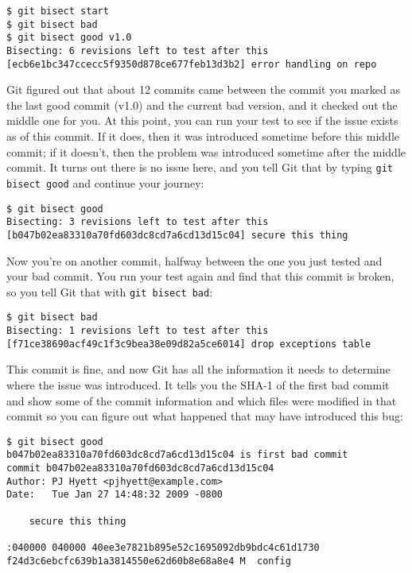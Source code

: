 \documentclass[a4paper]{book}
\newcounter{tab}[chapter]
\begin{document}
\begin{shaded}\begin{verbatim}
$ git bisect start
$ git bisect bad
$ git bisect good v1.0
Bisecting: 6 revisions left to test after this
[ecb6e1bc347ccecc5f9350d878ce677feb13d3b2] error handling on repo
\end{verbatim}\end{shaded}

Git figured out that about 12 commits came between the commit you marked as the last good commit (v1.0) and the current bad version, and it checked out the middle one for you. At this point, you can run your test to see if the issue exists as of this commit. If it does, then it was introduced sometime before this middle commit; if it doesn't, then the problem was introduced sometime after the middle commit. It turns out there is no issue here, and you tell Git that by typing \texttt{git bisect good} and continue your journey:

\begin{shaded}\begin{verbatim}
$ git bisect good
Bisecting: 3 revisions left to test after this
[b047b02ea83310a70fd603dc8cd7a6cd13d15c04] secure this thing
\end{verbatim}\end{shaded}

Now you're on another commit, halfway between the one you just tested and your bad commit. You run your test again and find that this commit is broken, so you tell Git that with \texttt{git bisect bad}:

\begin{shaded}\begin{verbatim}
$ git bisect bad
Bisecting: 1 revisions left to test after this
[f71ce38690acf49c1f3c9bea38e09d82a5ce6014] drop exceptions table
\end{verbatim}\end{shaded}

This commit is fine, and now Git has all the information it needs to determine where the issue was introduced. It tells you the SHA-1 of the first bad commit and show some of the commit information and which files were modified in that commit so you can figure out what happened that may have introduced this bug:

\begin{shaded}\begin{verbatim}
$ git bisect good
b047b02ea83310a70fd603dc8cd7a6cd13d15c04 is first bad commit
commit b047b02ea83310a70fd603dc8cd7a6cd13d15c04
Author: PJ Hyett <pjhyett@example.com>
Date:   Tue Jan 27 14:48:32 2009 -0800

    secure this thing

:040000 040000 40ee3e7821b895e52c1695092db9bdc4c61d1730
f24d3c6ebcfc639b1a3814550e62d60b8e68a8e4 M  config
\end{verbatim}\end{shaded}
\end{document}
